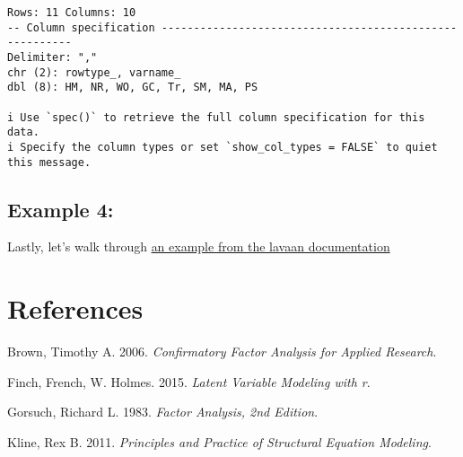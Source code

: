 \documentclass[
  letterpaper,
  DIV=11,
  numbers=noendperiod]{scrreprt}
\newlength{\cslhangindent}
\newlength{\cslentryspacingunit} %
\newenvironment{CSLReferences}[2] %
 {%
  \setlength{\parindent}{0pt}
  \ifodd #1
  \let\oldpar\par
  \def\par{\hangindent=\cslhangindent\oldpar}
  \fi
  \setlength{\parskip}{#2\cslentryspacingunit}
 }%
 {}
\begin{document}
\begin{verbatim}
Rows: 11 Columns: 10
-- Column specification --------------------------------------------------------
Delimiter: ","
chr (2): rowtype_, varname_
dbl (8): HM, NR, WO, GC, Tr, SM, MA, PS

i Use `spec()` to retrieve the full column specification for this data.
i Specify the column types or set `show_col_types = FALSE` to quiet this message.
\end{verbatim}

\hypertarget{example-4}{%
\section{Example 4:}\label{example-4}}

Lastly, let's walk through
\href{https://www.lavaan.ugent.be/tutorial/cfa.html}{an example from the
lavaan documentation}


\hypertarget{references}{%
\chapter*{References}\label{references}}


\hypertarget{refs}{}
\begin{CSLReferences}{1}{0}
\leavevmode{}%
Brown, Timothy A. 2006. \emph{Confirmatory Factor Analysis for Applied
Research}.

\leavevmode{}%
Finch, French, W. Holmes. 2015. \emph{Latent Variable Modeling with r}.

\leavevmode{}%
Gorsuch, Richard L. 1983. \emph{Factor Analysis, 2nd Edition}.

\leavevmode{}%
Kline, Rex B. 2011. \emph{Principles and Practice of Structural Equation
Modeling}.

\end{CSLReferences}
\end{document}
